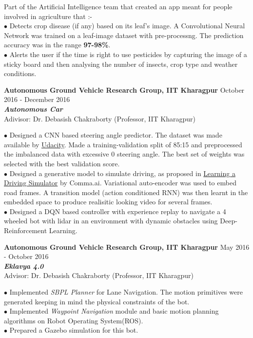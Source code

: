 \documentclass[10pt]{article}
\newcommand{\SmallEntryGap}{\vspace{0.2cm}}
\newcommand{\indentedpar}[1]{
  \hangindent=1cm \hangafter=0 #1
}
\begin{document}
\SmallEntryGap

\indentedpar{
Part of the Artificial Intelligence team that created an app meant for people involved in agriculture that :-\\
$\bullet$ Detects crop disease (if any) based on its leaf's image. A Convolutional Neural Network was trained on a leaf-image dataset with pre-processng. The prediction accuracy was in the range \textbf{97-98\%}.\\
$\bullet$ Alerts the user if the time is right to use pesticides by capturing the image of a sticky board and then analysing  the number of insects, crop type and weather conditions.
}

\SmallEntryGap

\textbf{Autonomous Ground Vehicle Research Group, IIT Kharagpur} \hfill October 2016 - December 2016\\
\textbf{\emph{Autonomous Car}}\\
Adivisor: Dr. Debasish Chakraborty (Professor, IIT Kharagpur)

\SmallEntryGap

\indentedpar{
$\bullet$ Designed a CNN based steering angle predictor. The dataset was made available by \href{https://github.com/udacity/self-driving-car}{Udacity}. Made a training-validation split of 85:15 and preprocessed the imbalanced data with excessive 0 steering angle. The best set of weights was selected with the best validation score.\\
$\bullet$ Designed a generative model to simulate driving, as proposed in \href{https://arxiv.org/pdf/1608.01230.pdf}{Learning a Driving Simulator} by Comma.ai. Variational auto-encoder was used to embed road frames. A transition model (action conditioned RNN) was then learnt in the embedded space to produce realisitic looking video for several frames.\\
$\bullet$ Designed a DQN based controller with experience replay to navigate a 4 wheeled bot with lidar in an environment with dynamic obstacles using Deep-Reinforcement Learning.
}

\SmallEntryGap


\textbf{Autonomous Ground Vehicle Research Group, IIT Kharagpur} \hfill May 2016 - October 2016\\
\textbf{\emph{Eklavya 4.0}}\\
Advisor: Dr. Debasish Chakraborty (Professor, IIT Kharagpur)

\SmallEntryGap

\indentedpar{
$\bullet$ Implemented \emph{SBPL Planner} for Lane Navigation. The motion primitives were generated keeping in mind the physical constraints of the bot.\\
$\bullet$ Implemented \emph{Waypoint Navigation} module and basic motion planning algorithms on Robot Operating System(ROS).\\
$\bullet$ Prepared a Gazebo simulation for this bot.
}
\end{document}
